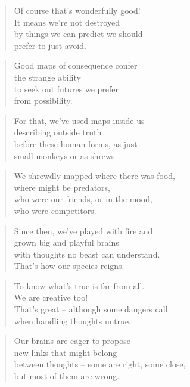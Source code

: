 \documentclass[14pt,a4paper]{article}
\begin{document}
\begin{verse}
Of course that’s wonderfully good!\\
It means we’re not destroyed\\
by things we can predict we should\\
prefer to just avoid.
\end{verse}

\begin{verse}
Good maps of consequence confer\\
the strange ability\\
to seek out futures we prefer\\
from possibility.
\end{verse}

\begin{verse}
For that, we’ve used maps inside us\\
describing outside truth\\
before these human forms, as just\\
small monkeys or as shrews.
\end{verse}

\begin{verse}
We shrewdly mapped where there was food,\\
where might be predators,\\
who were our friends, or in the mood,\\
who were competitors.
\end{verse}

\begin{verse}
Since then, we’ve played with fire and\\
grown big and playful brains\\
with thoughts no beast can understand.\\
That’s how our species reigns.
\end{verse}

\begin{verse}
To know what’s true is far from all.\\
We are creative too!\\
That’s great – although some dangers call\\
when handling thoughts untrue.
\end{verse}

\begin{verse}
Our brains are eager to propose\\
new links that might belong\\
between thoughts – some are right, some close,\\
but most of them are wrong.
\end{verse}
\end{document}
